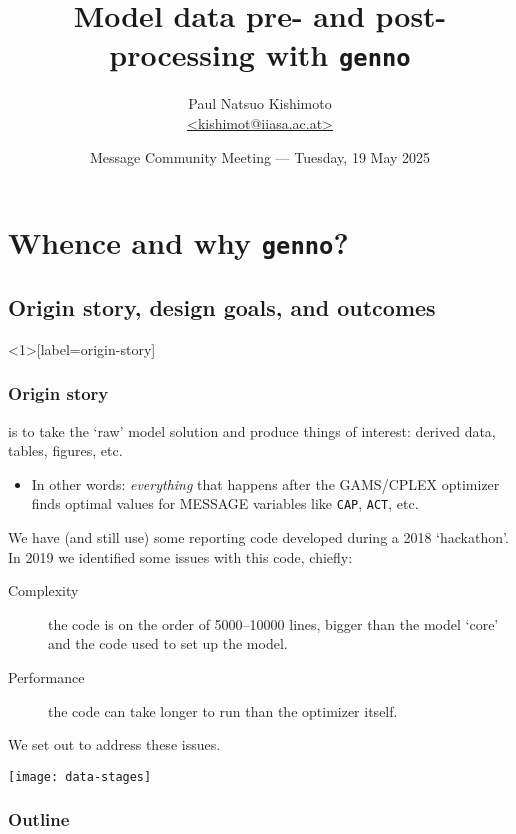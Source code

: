 \documentclass[12pt,aspectratio=169]{beamer}
\title{Model data pre- and post-processing with \texttt{genno}}
\date{
  \texorpdfstring{Message Community Meeting — Tuesday, 19 May 2025}%
  {2025-05-19}}
\author{\texorpdfstring{Paul Natsuo Kishimoto\\
  \href{mailto:kishimot@iiasa.ac.at}{\ttfamily \scriptsize <kishimot@iiasa.ac.at>}%
  }{Paul Natsuo Kishimoto <kishimot@iiasa.ac.at>}}
\begin{document}
\maketitle

\section{Whence and why \texttt{genno}?}

\subsection{Origin story, design goals, and outcomes}

\begin{frame}<1>[label=origin-story]
\frametitle{Origin story}

 is to take the ‘raw’ model solution
and produce things of interest: derived data, tables, figures, etc.
\begin{itemize}
  \item In other words: \emph{everything} that happens after the GAMS/CPLEX optimizer
    finds optimal values for MESSAGE variables like \texttt{CAP}, \texttt{ACT}, etc.
\end{itemize}

\pause
\medskip
We have (and still use) some reporting code developed during a 2018 ‘hackathon’.
In 2019 we identified some issues with this code, chiefly:

\begin{description}
  \item [Complexity] the code is on the order of 5000–10000 lines,
    bigger than the model ‘core’ and the code used to set up the model.
  \item [Performance] the code can take longer to run than the optimizer itself.
\end{description}

\medskip
We set out to address these issues.
\end{frame}

\begin{frame}[plain]
\texttt{[image: data-stages]}
\end{frame}


\begin{frame}
\frametitle{Outline}

\tableofcontents

\end{frame}
\end{document}
